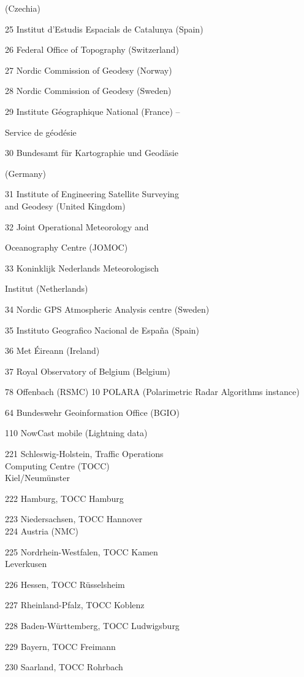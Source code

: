 (Czechia)

25 Institut d'Estudis Espacials de Catalunya (Spain)

26 Federal Office of Topography (Switzerland)

27 Nordic Commission of Geodesy (Norway)

28 Nordic Commission of Geodesy (Sweden)

29 Institute Géographique National (France) --

Service de géodésie

30 Bundesamt für Kartographie und Geodäsie

(Germany)

31 Institute of Engineering Satellite Surveying\\
and Geodesy (United Kingdom)

32 Joint Operational Meteorology and

Oceanography Centre (JOMOC)

33 Koninklijk Nederlands Meteorologisch

Institut (Netherlands)

34 Nordic GPS Atmospheric Analysis centre (Sweden)

35 Instituto Geografico Nacional de España (Spain)

36 Met Éireann (Ireland)

37 Royal Observatory of Belgium (Belgium)

78 Offenbach (RSMC) 10 POLARA (Polarimetric Radar Algorithms instance)

64 Bundeswehr Geoinformation Office (BGIO)

110 NowCast mobile (Lightning data)

221 Schleswig-Holstein, Traffic Operations\\
Computing Centre (TOCC)\\
Kiel/Neumünster

222 Hamburg, TOCC Hamburg

223 Niedersachsen, TOCC Hannover\\
224 Austria (NMC)

225 Nordrhein-Westfalen, TOCC Kamen\\
Leverkusen

226 Hessen, TOCC Rüsselsheim

227 Rheinland-Pfalz, TOCC Koblenz

228 Baden-Württemberg, TOCC Ludwigsburg

229 Bayern, TOCC Freimann

230 Saarland, TOCC Rohrbach


